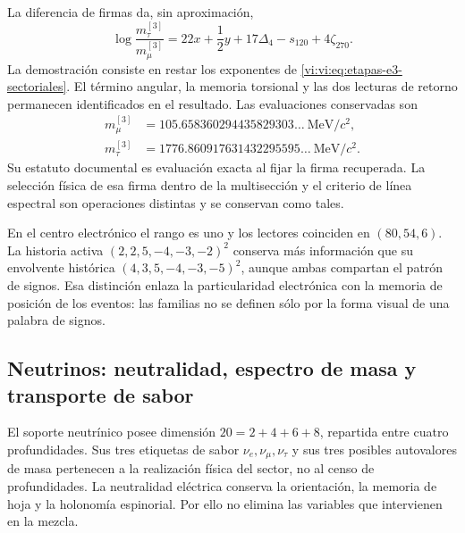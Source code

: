 La diferencia de firmas da, sin aproximación,
\begin{equation}
 \log\frac{m_\tau^{[3]}}{m_\mu^{[3]}}
 =22x+\frac12y+17\Delta_4-s_{120}+4\zeta_{270}.
 \label{vi:vi:eq:razon-tau-muon}
\end{equation}
La demostración consiste en restar los exponentes de
\eqref{vi:vi:eq:etapas-e3-sectoriales}. El término angular, la memoria
torsional y las dos lecturas de retorno permanecen identificados en el
resultado. Las evaluaciones conservadas son
\begin{align*}
 m_\mu^{[3]}&=105.658360294435829303\ldots\ \mathrm{MeV}/c^2,\\
 m_\tau^{[3]}&=1776.860917631432295595\ldots\ \mathrm{MeV}/c^2.
\end{align*}
Su estatuto documental es evaluación exacta al fijar la firma recuperada.
La selección física de esa firma dentro de la multisección y el criterio
de línea espectral son operaciones distintas y se conservan como tales.

En el centro electrónico el rango es uno y los lectores coinciden en
\((80,54,6)\). La historia activa
\((2,2,5,-4,-3,-2)^2\) conserva más información que su envolvente
histórica \((4,3,5,-4,-3,-5)^2\), aunque ambas compartan el patrón de
signos. Esa distinción enlaza la particularidad electrónica con la
memoria de posición de los eventos: las familias no se definen sólo por
la forma visual de una palabra de signos.

\subsection{Neutrinos: neutralidad, espectro de masa y transporte de sabor}
\label{vi:vi:subsec:neutrinos-familias}

El soporte neutrínico posee dimensión \(20=2+4+6+8\), repartida entre
cuatro profundidades. Sus tres etiquetas de sabor
\(\nu_e,\nu_\mu,\nu_\tau\) y sus tres posibles autovalores de masa
pertenecen a la realización física del sector, no al censo de
profundidades. La neutralidad eléctrica conserva la orientación, la
memoria de hoja y la holonomía espinorial. Por ello no elimina las
variables que intervienen en la mezcla.

